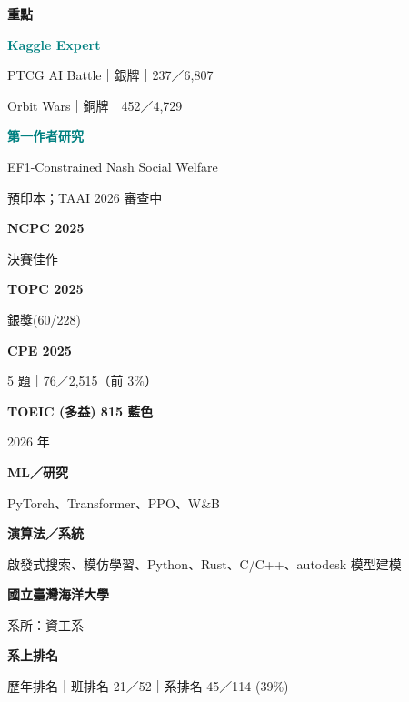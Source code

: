 \documentclass[10pt,a4paper]{article}
\newcommand{\sideheading}[1]{\vspace{10pt}{\color{navy}\fontsize{10.5}{14}\selectfont\bfseries #1}\par\vspace{5pt}}
\newcommand{\award}[2]{\textbf{#1}\par{\color{muted}#2}\par\vspace{5pt}}
\begin{document}
\begin{minipage}[t]{51mm}
\vspace{0pt}
\begin{tcolorbox}[colback=pale,colframe=pale,boxrule=0pt,arc=2mm,
  left=4mm,right=4mm,top=4mm,bottom=4mm,boxsep=0pt]
\fontsize{9.4}{13.2}\selectfont
\raggedright
{\color{navy}\fontsize{11.2}{14.8}\selectfont\bfseries 重點}\par
\vspace{5pt}
\award{\textcolor{teal}{Kaggle Expert}}{PTCG AI Battle｜銀牌｜237／6,807\par Orbit Wars｜銅牌｜452／4,729}
\award{\textcolor{teal}{第一作者研究}}{EF1-Constrained Nash Social Welfare\par 預印本；TAAI 2026 審查中}

\sideheading{競賽與檢定}
\award{NCPC 2025}{決賽佳作}
\award{TOPC 2025}{銀獎(60/228)}
\award{CPE 2025}{5 題｜76／2,515（前 3\%）}
\award{TOEIC (多益) 815 藍色}{2026 年}

\sideheading{技能}
\textbf{ML／研究}\par
PyTorch、Transformer、PPO、W\&B\par
\vspace{3pt}
\textbf{演算法／系統}\par
啟發式搜索、模仿學習、Python、Rust、C/C++、autodesk 模型建模



\sideheading{學歷}
\textbf{國立臺灣海洋大學}\par
{\color{muted}系所：資工系}\par
\vspace{5pt}
\textbf{系上排名}\par
\vspace{3pt}
{\color{muted}\fontsize{8.6}{11.5}\selectfont 歷年排名｜班排名 21／52｜系排名 45／114 (39\%)}
\end{tcolorbox}
\end{minipage}\hfill
\end{document}
